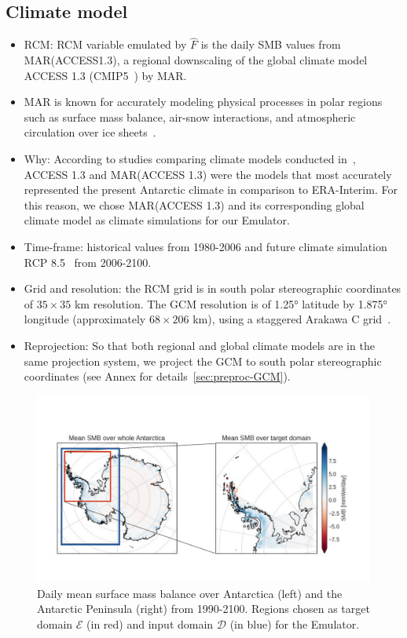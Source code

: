 \documentclass[a4paper,11pt,oneside]{report}
\begin{document}
\subsection{Climate model}
\begin{itemize}
   \item RCM: RCM variable emulated by $\hat{F}$ is the daily SMB values from MAR(ACCESS1.3), a regional downscaling of the global climate model ACCESS 1.3 (CMIP5~\cite{ACCESS13, CMIP5}) by MAR. 
    \item MAR is known for accurately modeling physical processes in polar regions such as surface mass balance, air-snow interactions, and atmospheric circulation over ice sheets~\cite{MAR}. 
    \item Why: According to studies comparing climate models conducted in~\cite{Kittel, Agosta2015}, ACCESS 1.3 and MAR(ACCESS 1.3) were the models that most accurately represented the present Antarctic climate in comparison to ERA-Interim. For this reason, we chose MAR(ACCESS 1.3) and its corresponding global climate model as climate simulations for our Emulator.  
    \item Time-frame: historical values from 1980-2006 and future climate simulation RCP 8.5~\cite{Moss2010} from 2006-2100. 
    \item Grid and resolution: the RCM grid is in south polar stereographic coordinates of $35 \times 35$ \si{km} resolution. The GCM resolution is of 1.25° latitude by 1.875° longitude (approximately $68 \times 206$ \si{km}), using a staggered Arakawa C grid~\cite{ACCESS13, ACCESS13_2}. 
    \item Reprojection: So that both regional and global climate models are in the same projection system, we project the GCM to south polar stereographic coordinates (see Annex for details~\ref{sec:preproc-GCM}). 
\end{itemize}

\begin{figure}[!t]
  \centering
  \includegraphics[width=\columnwidth]{images/domains.pdf}
  \caption []{\small Daily mean surface mass balance over Antarctica (left) and the Antarctic Peninsula (right) from 1990-2100. Regions chosen as target domain $\mathcal{E}$ (in red) and input domain $\mathcal{D}$ (in blue) for the Emulator.}
  \vspace{-3mm}
    \label{fig:region-of-choice}
\end{figure}
\end{document}
